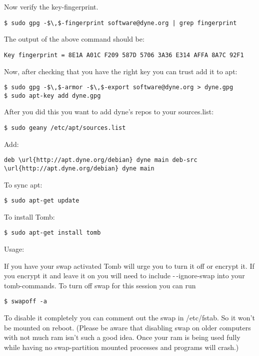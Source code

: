 \documentclass{article}
\begin{document}
 Now verify the key-fingerprint.
\begin{lstlisting}
$ sudo gpg -$\,$-fingerprint software@dyne.org | grep fingerprint
\end{lstlisting}



 The output of the above command should be:
\begin{lstlisting}
Key fingerprint = 8E1A A01C F209 587D 5706 3A36 E314 AFFA 8A7C 92F1
\end{lstlisting}



 Now, after checking that you have the right key you can trust add it to apt:
\begin{lstlisting}
$ sudo gpg -$\,$-armor -$\,$-export software@dyne.org > dyne.gpg
$ sudo apt-key add dyne.gpg
\end{lstlisting}



 After you did this you want to add dyne's repos to your sources.list:
\begin{lstlisting}
$ sudo geany /etc/apt/sources.list
\end{lstlisting}



 Add:
\begin{lstlisting}
deb \url{http://apt.dyne.org/debian} dyne main deb-src \url{http://apt.dyne.org/debian} dyne main
\end{lstlisting}



 To sync apt:
\begin{lstlisting}
$ sudo apt-get update
\end{lstlisting}



 To install Tomb:
\begin{lstlisting}
$ sudo apt-get install tomb
\end{lstlisting}



 Usage:


 If you have your swap activated Tomb will urge you to turn it off or encrypt it. If you encrypt it and leave it on you will need to include -$\,$-ignore-swap into your tomb-commands. To turn off swap for this session you can run
\begin{lstlisting}
$ swapoff -a
\end{lstlisting}



 To disable it completely you can comment out the swap in /etc/fstab. So it won't be mounted on reboot. (Please be aware that disabling swap on older computers with not much ram isn't such a good idea. Once your ram is being used fully while having no swap-partition mounted processes and programs will crash.)
\end{document}
